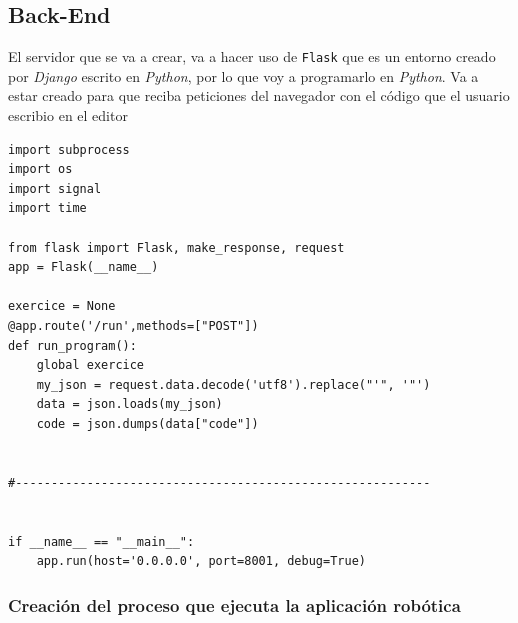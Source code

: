\subsection{Back-End}
El servidor que se va a crear, va a hacer uso de \texttt{Flask} que es un entorno creado por \textit{Django} escrito en \textit{Python}, por lo que voy a programarlo en \textit{Python}. Va a estar creado para que reciba peticiones del navegador con el código que el usuario escribio en el editor



\begin{lstlisting}[frame=single,breaklines=true, label=Extracción del código en el servidor Flask, caption=Extracción del código en el servidor Flask,  captionpos=b]
import subprocess
import os
import signal
import time

from flask import Flask, make_response, request
app = Flask(__name__)   

exercice = None
@app.route('/run',methods=["POST"])
def run_program():
    global exercice
	my_json = request.data.decode('utf8').replace("'", '"')
    data = json.loads(my_json)
    code = json.dumps(data["code"])
    
    
#----------------------------------------------------------


if __name__ == "__main__":
    app.run(host='0.0.0.0', port=8001, debug=True)
\end{lstlisting}

\subsubsection{Creación del proceso que ejecuta la aplicación robótica}

